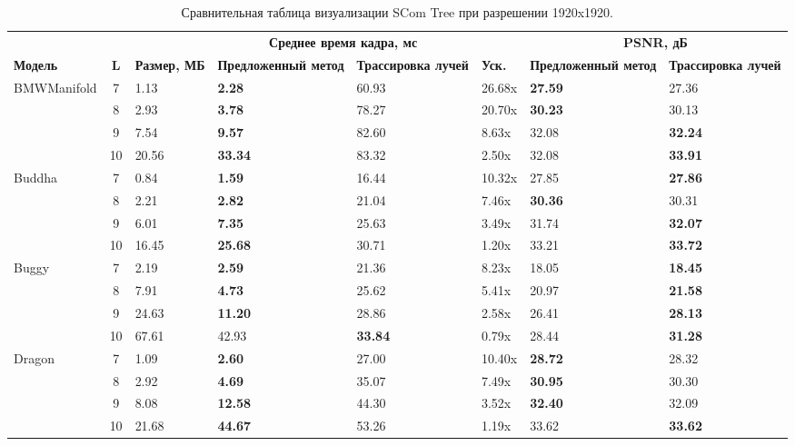 \begin{table}[htbp]
  \centering
  \scriptsize
  \caption{Сравнительная таблица визуализации SCom Tree при разрешении 1920x1920.}
  \label{tab:scom_comparison_full_1920}
  \begin{tabular}{lcp{1cm}p{2cm}p{2cm}lp{2cm}p{2cm}}
    \toprule
    & & & \multicolumn{2}{c}{\textbf{Среднее время кадра, мс}} & & \multicolumn{2}{c}{\textbf{PSNR, дБ}}  \\
    \cmidrule(l){4-5} \cmidrule(l){7-8}
    \textbf{Модель} & \textbf{L} & \textbf{Размер, МБ} & \textbf{Предложенный метод} & \textbf{Трассировка лучей} & \textbf{Уск.} & \textbf{Предложенный метод} & \textbf{Трассировка лучей} \\
\midrule
    BMWManifold & 7 & 1.13 & \textbf{2.28} & 60.93 & 26.68x & \textbf{27.59} & 27.36 \\
     & 8 & 2.93 & \textbf{3.78} & 78.27 & 20.70x & \textbf{30.23} & 30.13 \\
     & 9 & 7.54 & \textbf{9.57} & 82.60 & 8.63x & 32.08 & \textbf{32.24} \\
     & 10 & 20.56 & \textbf{33.34} & 83.32 & 2.50x & 32.08 & \textbf{33.91} \\
    \midrule
    Buddha & 7 & 0.84 & \textbf{1.59} & 16.44 & 10.32x & 27.85 & \textbf{27.86} \\
     & 8 & 2.21 & \textbf{2.82} & 21.04 & 7.46x & \textbf{30.36} & 30.31 \\
     & 9 & 6.01 & \textbf{7.35} & 25.63 & 3.49x & 31.74 & \textbf{32.07} \\
     & 10 & 16.45 & \textbf{25.68} & 30.71 & 1.20x & 33.21 & \textbf{33.72} \\
    \midrule
    Buggy & 7 & 2.19 & \textbf{2.59} & 21.36 & 8.23x & 18.05 & \textbf{18.45} \\
     & 8 & 7.91 & \textbf{4.73} & 25.62 & 5.41x & 20.97 & \textbf{21.58} \\
     & 9 & 24.63 & \textbf{11.20} & 28.86 & 2.58x & 26.41 & \textbf{28.13} \\
     & 10 & 67.61 & 42.93 & \textbf{33.84} & 0.79x & 28.44 & \textbf{31.28} \\
    \midrule
    Dragon & 7 & 1.09 & \textbf{2.60} & 27.00 & 10.40x & \textbf{28.72} & 28.32 \\
     & 8 & 2.92 & \textbf{4.69} & 35.07 & 7.49x & \textbf{30.95} & 30.30 \\
     & 9 & 8.08 & \textbf{12.58} & 44.30 & 3.52x & \textbf{32.40} & 32.09 \\
     & 10 & 21.68 & \textbf{44.67} & 53.26 & 1.19x & 33.62 & \textbf{33.62} \\

\end{tabular}
\end{table}
